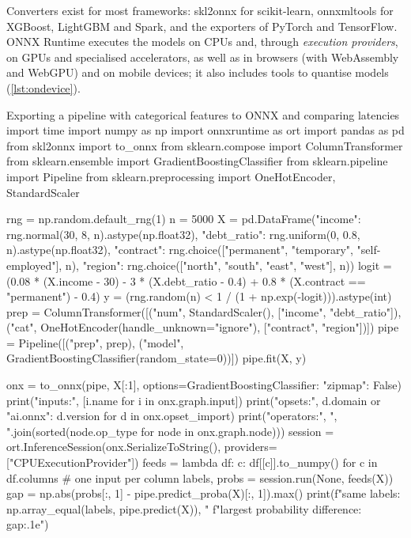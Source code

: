 Converters exist for most frameworks: skl2onnx for scikit-learn, onnxmltools for XGBoost, LightGBM and
Spark, and the exporters of PyTorch and TensorFlow. ONNX Runtime \citep{onnxruntime2021} executes the
models on CPUs and, through \emph{execution providers}, on GPUs and specialised accelerators, as well as
in browsers (with WebAssembly and WebGPU) and on mobile devices; it also includes tools to quantise models
(\cref{lst:ondevice}).

\begin{pylisting}[label={lst:onnx}]{Exporting a pipeline with categorical features to ONNX and comparing latencies}
import time
import numpy as np
import onnxruntime as ort
import pandas as pd
from skl2onnx import to_onnx
from sklearn.compose import ColumnTransformer
from sklearn.ensemble import GradientBoostingClassifier
from sklearn.pipeline import Pipeline
from sklearn.preprocessing import OneHotEncoder, StandardScaler

rng = np.random.default_rng(1)
n = 5000
X = pd.DataFrame({"income": rng.normal(30, 8, n).astype(np.float32),
                  "debt_ratio": rng.uniform(0, 0.8, n).astype(np.float32),
                  "contract": rng.choice(["permanent", "temporary", "self-employed"], n),
                  "region": rng.choice(["north", "south", "east", "west"], n)})
logit = (0.08 * (X.income - 30) - 3 * (X.debt_ratio - 0.4)
         + 0.8 * (X.contract == "permanent") - 0.4)
y = (rng.random(n) < 1 / (1 + np.exp(-logit))).astype(int)
prep = ColumnTransformer([("num", StandardScaler(), ["income", "debt_ratio"]),
                          ("cat", OneHotEncoder(handle_unknown="ignore"),
                           ["contract", "region"])])
pipe = Pipeline([("prep", prep), ("model", GradientBoostingClassifier(random_state=0))])
pipe.fit(X, y)

onx = to_onnx(pipe, X[:1], options={GradientBoostingClassifier: {"zipmap": False}})
print("inputs:", [i.name for i in onx.graph.input])
print("opsets:", {d.domain or "ai.onnx": d.version for d in onx.opset_import})
print("operators:", ", ".join(sorted({node.op_type for node in onx.graph.node})))
session = ort.InferenceSession(onx.SerializeToString(),
                               providers=["CPUExecutionProvider"])
feeds = lambda df: {c: df[[c]].to_numpy() for c in df.columns}   # one input per column
labels, probs = session.run(None, feeds(X))
gap = np.abs(probs[:, 1] - pipe.predict_proba(X)[:, 1]).max()
print(f"same labels: {np.array_equal(labels, pipe.predict(X))}, "
      f"largest probability difference: {gap:.1e}")


\end{pylisting}
